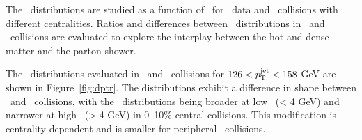 
The \Dptr\ distributions are studied as a function of \ptjet\ for \pp\ data and \PbPb\ collisions with different centralities. Ratios and differences between \Dptr\ distributions in \pbpb\ and \pp\ collisions are evaluated to explore the interplay between the hot and dense matter and the parton shower.

The \Dptr\ distributions evaluated in \pp\ and \pbpb\ collisions for $126 < \mbox{$p_{\mathrm{T}}^{\mathrm{jet}}$} < 158$ GeV are shown in Figure~\ref{fig:dptr}. The distributions exhibit a difference in shape between \PbPb\ and \pp\ collisions, 
with the \pbpb\ distributions being broader at low \pt\ (\pt < 4 GeV) and narrower at high \pt\ (\pt > 4 GeV) in \mbox{0--10\%} central collisions. This modification is centrality dependent and is smaller for peripheral \pbpb\ collisions.

